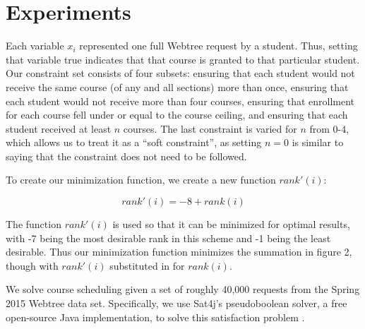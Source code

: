 
\section{Experiments}
\label{sec:expts}

Each variable $x_i$ represented one full Webtree request by a
student. Thus, setting that variable true indicates that that course
is granted to that particular student. Our constraint set consists of
four subsets: ensuring that each student would not receive the same
course (of any and all sections) more than once, ensuring that each
student would not receive more than four courses, ensuring that
enrollment for each course fell under or equal to the course ceiling,
and ensuring that each student received at least $n$ courses. The
last constraint is varied for $n$ from {0-4}, which allows us to treat it as
a ``soft constraint'', as setting $n=0$ is similar to saying that
the constraint does not need to be followed. 

To create our minimization function, we create a new function $rank'(i)$:

\begin{equation} rank'(i) = -8 + rank(i) \end{equation}

The function $rank'(i)$ is used so that it can be minimized for optimal
results, with -7 being the most desirable rank in this scheme and -1 being
the least desirable. Thus our minimization function minimizes the summation
in figure 2, though with $rank'(i)$ substituted in for $rank(i)$.

We solve course scheduling given a set of roughly 40,000 requests
from the Spring 2015 Webtree data set. Specifically, we use Sat4j's
pseudoboolean solver, a free open-source Java implementation, to solve
this satisfaction problem \cite{sat4j}.
